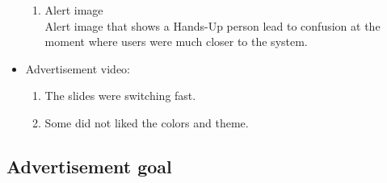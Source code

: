 \begin{itemize}
\begin{enumerate}
\item	Alert image \\
Alert image that shows a Hands-Up person lead to confusion at the moment where users were much closer to the system.
\end{enumerate}

\item Advertisement video: \\
\begin{enumerate}
\item The slides were switching fast.
\item Some did not liked the colors and theme. 
\end{enumerate}


\end{itemize}

\subsection{Advertisement goal}


